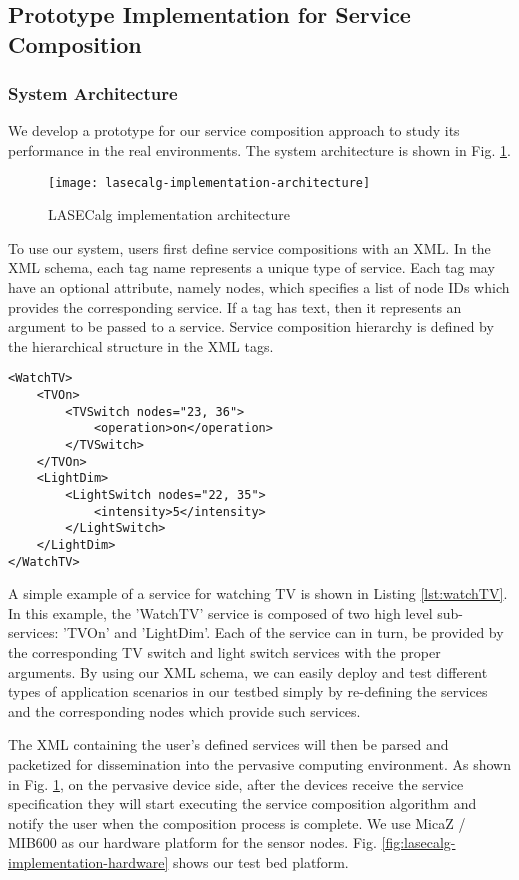 \subsection{Prototype Implementation for Service Composition}\label{lasecprototype}

\subsubsection{System Architecture}
We develop a prototype for our service composition approach to study its performance in the real environments. The system architecture is shown in Fig. \ref{fig:lasecalg-implementation-architecture}.

\begin{figure}
\centering
\texttt{[image: lasecalg-implementation-architecture]}
\caption{LASECalg implementation architecture}
\label{fig:lasecalg-implementation-architecture}
\end{figure}

To use our system, users first define service compositions with an XML. In the XML schema, each tag name represents a unique type of service. Each tag may have an optional attribute, namely nodes, which specifies a list of node IDs which provides the corresponding service. If a tag has text, then it represents an argument to be passed to a service. Service composition hierarchy is defined by the hierarchical structure in the XML tags.

\begin{lstlisting}[caption=A simple service for switching on TV, label=lst:watchTV]
<WatchTV>
	<TVOn>
		<TVSwitch nodes="23, 36">
			<operation>on</operation>
		</TVSwitch>
	</TVOn>
	<LightDim>
		<LightSwitch nodes="22, 35">
			<intensity>5</intensity>
		</LightSwitch>
	</LightDim>
</WatchTV>
\end{lstlisting}

A simple example of a service for watching TV is shown in Listing \ref{lst:watchTV}. In this example, the 'WatchTV' service is composed of two high level sub-services: 'TVOn' and 'LightDim'. Each of the service can in turn, be provided by the corresponding TV switch and light switch services with the proper arguments. By using our XML schema, we can easily deploy and test different types of application scenarios in our testbed simply by re-defining the services and the corresponding nodes which provide such services.

The XML containing the user's defined services will then be parsed and packetized for dissemination into the pervasive computing environment. As shown in Fig. \ref{fig:lasecalg-implementation-architecture}, on the pervasive device side, after the devices receive the service specification they will start executing the service composition algorithm and notify the user when the composition process is complete. We use MicaZ / MIB600 as our hardware platform for the sensor nodes. Fig. \ref{fig:lasecalg-implementation-hardware} shows our test bed platform.

